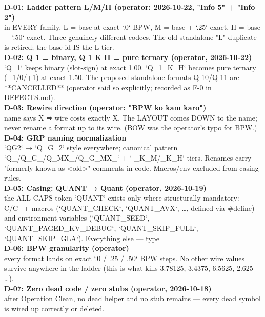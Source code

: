 \noindent\textbf{D-01: Ladder pattern L/M/H (operator: 2026-10-22, "Info 5" + "Info 2")}\\
\noindent in EVERY family, L = base at exact `.0` BPW, M = base + `.25` exact, H = base + `.50` exact. Three genuinely different codecs. The old standalone "L" duplicate is retired; the base id IS the L tier.\\

\noindent\textbf{D-02: Q 1 = binary, Q 1 K H = pure ternary (operator, 2026-10-22)}\\
\noindent `Q\_1` keeps binary (slot-sign) at exact 1.00. `Q\_1\_K\_H` becomes pure ternary (−1/0/+1) at exact 1.50. The proposed standalone formats Q-10/Q-11 are **CANCELLED** (operator said so explicitly; recorded as F-0 in DEFECTS.md).\\

\noindent\textbf{D-03: Rewire direction (operator: "BPW ko kam karo")}\\
\noindent name says X ⇒ wire costs exactly X. The LAYOUT comes DOWN to the name; never rename a format up to its wire. (BOW was the operator's typo for BPW.)\\

\noindent\textbf{D-04: GRP naming normalization}\\
\noindent `QG2` → `Q\_G\_2` style everywhere; canonical pattern `Q\_/Q\_G\_/Q\_MX\_/Q\_G\_MX\_` + ` \_K\_M/\_K\_H` tiers. Renames carry "formerly known as <old>" comments in code. Macros/env excluded from casing rules.\\

\noindent\textbf{D-05: Casing: QUANT → Quant (operator, 2026-10-19)}\\
\noindent the ALL-CAPS token `QUANT` exists only where structurally mandatory: C/C++ macros (`QUANT\_CHECK`, `QUANT\_AVX`, …, defined via \#define) and environment variables (`QUANT\_SEED`, `QUANT\_PAGED\_KV\_DEBUG`, `QUANT\_SKIP\_FULL`, `QUANT\_SKIP\_GLA`). Everything else — type\\

\noindent\textbf{D-06: BPW granularity (operator)}\\
\noindent every format lands on exact `.0 / .25 / .50` BPW steps. No other wire values survive anywhere in the ladder (this is what kills 3.78125, 3.4375, 6.5625, 2.625 …).\\

\noindent\textbf{D-07: Zero dead code / zero stubs (operator, 2026-10-18)}\\
\noindent after Operation Clean, no dead helper and no stub remains — every dead symbol is wired up correctly or deleted.\\

